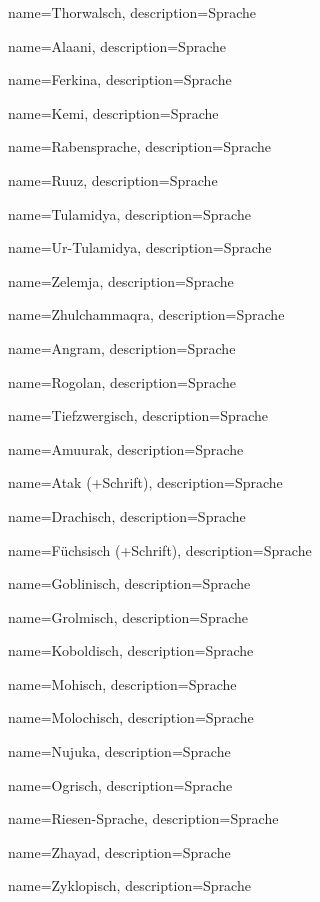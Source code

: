 {
    name={Thorwalsch},
    description={Sprache}
}


{
    name={Alaani},
    description={Sprache}
}


{
    name={Ferkina},
    description={Sprache}
}


{
    name={Kemi},
    description={Sprache}
}


{
    name={Rabensprache},
    description={Sprache}
}


{
    name={Ruuz},
    description={Sprache}
}


{
    name={Tulamidya},
    description={Sprache}
}


{
    name={Ur-Tulamidya},
    description={Sprache}
}


{
    name={Zelemja},
    description={Sprache}
}


{
    name={Zhulchammaqra},
    description={Sprache}
}


{
    name={Angram},
    description={Sprache}
}


{
    name={Rogolan},
    description={Sprache}
}


{
    name={Tiefzwergisch},
    description={Sprache}
}


{
    name={Amuurak},
    description={Sprache}
}


{
    name={Atak (+Schrift)},
    description={Sprache}
}


{
    name={Drachisch},
    description={Sprache}
}


{
    name={Füchsisch (+Schrift)},
    description={Sprache}
}


{
    name={Goblinisch},
    description={Sprache}
}


{
    name={Grolmisch},
    description={Sprache}
}


{
    name={Koboldisch},
    description={Sprache}
}


{
    name={Mohisch},
    description={Sprache}
}


{
    name={Molochisch},
    description={Sprache}
}


{
    name={Nujuka},
    description={Sprache}
}


{
    name={Ogrisch},
    description={Sprache}
}


{
    name={Riesen-Sprache},
    description={Sprache}
}


{
    name={Zhayad},
    description={Sprache}
}


{
    name={Zyklopisch},
    description={Sprache}
}

